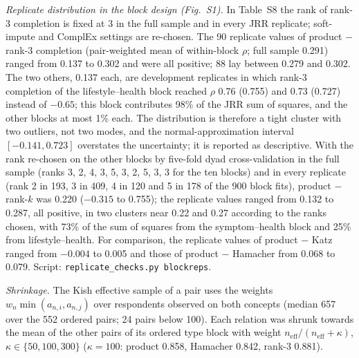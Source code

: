 \documentclass[journal]{IEEEtran}
\begin{document}
\emph{Replicate distribution in the block design (Fig.~S1).} In Table~S8 the rank of rank-3 completion is fixed at 3 in the full sample and in every JRR replicate; soft-impute and ComplEx settings are re-chosen. The 90 replicate values of product $-$ rank-3 completion (pair-weighted mean of within-block $\rho$; full sample 0.291) ranged from 0.137 to 0.302 and were all positive; 88 lay between 0.279 and 0.302. The two others, 0.137 each, are development replicates in which rank-3 completion of the lifestyle--health block reached $\rho$ 0.76 (0.755) and 0.73 (0.727) instead of $-0.65$; this block contributes 98\% of the JRR sum of squares, and the other blocks at most 1\% each. The distribution is therefore a tight cluster with two outliers, not two modes, and the normal-approximation interval $[-0.141, 0.723]$ overstates the uncertainty; it is reported as descriptive. With the rank re-chosen on the other blocks by five-fold dyad cross-validation in the full sample (ranks 3, 2, 4, 3, 5, 3, 2, 5, 3, 3 for the ten blocks) and in every replicate (rank 2 in 193, 3 in 409, 4 in 120 and 5 in 178 of the 900 block fits), product $-$ rank-$k$ was 0.220 ($-0.315$ to 0.755); the replicate values ranged from 0.132 to 0.287, all positive, in two clusters near 0.22 and 0.27 according to the ranks chosen, with 73\% of the sum of squares from the symptom--health block and 25\% from lifestyle--health. For comparison, the replicate values of product $-$ Katz ranged from $-0.004$ to 0.005 and those of product $-$ Hamacher from 0.068 to 0.079. Script: \texttt{replicate\_checks.py blockreps}.

\emph{Shrinkage.} The Kish effective sample of a pair uses the weights $w_n\min(a_{n,i},a_{n,j})$ over respondents observed on both concepts (median 657 over the 552 ordered pairs; 24 pairs below 100). Each relation was shrunk towards the mean of the other pairs of its ordered type block with weight $n_{\mathrm{eff}}/(n_{\mathrm{eff}}+\kappa)$, $\kappa\in\{50,100,300\}$ ($\kappa=100$: product 0.858, Hamacher 0.842, rank-3 0.881).
\end{document}
